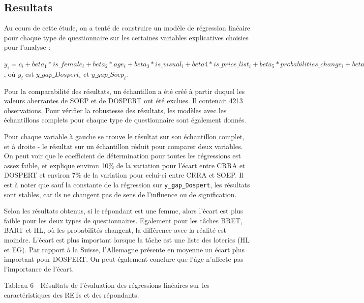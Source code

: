 \documentclass[12pt]{article}
\begin{document}
\subsection{Resultats}

Au cours de cette étude, on a tenté de construire un modèle de
régression linéaire pour chaque type de questionnaire sur les certaines
variables explicatives choisies pour l'analyse :

\(y_i = c_i + beta_1 * is\_female_i+ beta_2 * age_i + beta_3 * is\_visual_i + beta4 * is\_price\_list_i + beta_5 * probabilities\_change_i + beta_6 * stakes_i + beta_7 * germany_i + epsilon_i\)
, où \(y_i\) est \(y\_gap\_Dospert_i\) et \(y\_gap\_Soep_i\).

Pour la comparabilité des résultats, un échantillon a été créé à partir
duquel les valeurs aberrantes de SOEP et de DOSPERT ont été exclues. Il
contenait 4213 observations. Pour vérifier la robustesse des résultats,
les modèles avec les échantillons complets pour chaque type de
questionnaire sont également donnés.

Pour chaque variable à gauche se trouve le résultat sur son échantillon
complet, et à droite - le résultat sur un échantillon réduit pour
comparer deux variables. On peut voir que le coefficient de
détermination pour toutes les régressions est assez faible, et explique
environ 10\% de la variation pour l'écart entre CRRA et DOSPERT et
environ 7\% de la variation pour celui-ci entre CRRA et SOEP. Il est à
noter que sauf la constante de la régression sur
\texttt{y\_gap\_Dospert}, les résultats sont stables, car ils ne
changent pas de sens de l'influence ou de signification.

Selon les résultats obtenus, si le répondant est une femme, alors
l'écart est plus faible pour les deux types de questionnaires. Egalement
pour les tâches BRET, BART et HL, où les probabilités changent, la
différence avec la réalité est moindre. L'écart est plus important
lorsque la tâche est une liste des loteries (HL et EG). Par rapport à la
Suisse, l'Allemagne présente en moyenne un écart plus important pour
DOSPERT. On peut également conclure que l'âge n'affecte pas l'importance
de l'écart.

Tableau 6 - Résultats de l'évaluation des régressions linéaires sur les
caractéristiques des RETs et des répondants.
\end{document}
